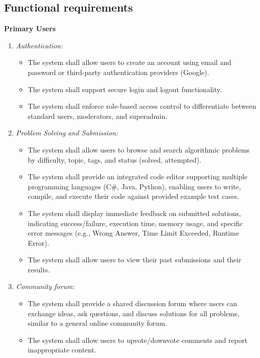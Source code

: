 \subsection{Functional requirements}
\vspace{0.3cm}
\noindent \textbf{\Large Primary Users}
\vspace{0.3cm}
\begin{enumerate}[label=\arabic*.]
    \item \textit{Authentication:}
        \begin{itemize}
            \item The system shall allow users to create an account using email and password or third-party authentication providers (Google).
            \item The system shall support secure login and logout functionality.
            \item The system shall enforce role-based access control to differentiate between standard users, moderators, and superadmin.
        \end{itemize}
    \item \textit{Problem Solving and Submission:}
        \begin{itemize}
            \item The system shall allow users to browse and search algorithmic problems by difficulty, topic, tags, and status (solved, attempted).
            \item The system shall provide an integrated code editor supporting multiple programming languages (C\#, Java, Python), enabling users to write, compile, and execute their code against provided example test cases.
            \item The system shall display immediate feedback on submitted solutions, indicating success/failure, execution time, memory usage, and specific error messages (e.g., Wrong Answer, Time Limit Exceeded, Runtime Error).
            \item The system shall allow users to view their past submissions and their results.
        \end{itemize}
    \item \textit{Community forum:}
        \begin{itemize}
            \item The system shall provide a shared discussion forum where users can exchange ideas, ask questions, and discuss solutions for all problems, similar to a general online community forum.
            \item The system shall allow users to upvote/downvote comments and report inappropriate content.

\end{itemize}
\end{enumerate}
